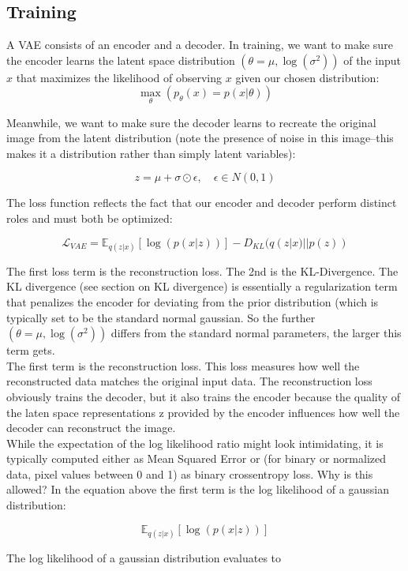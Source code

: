 \documentclass[12pt]{article}
\begin{document}
\subsection{Training}
A VAE consists of an encoder and a decoder. In training, we want to make sure the encoder learns the latent space distribution \((\theta = \mu, \log(\sigma^2))\) of the input \(x\) that maximizes the likelihood of observing \(x\) given our chosen distribution:
\[\max_\theta(p_\theta(x) = p(x | \theta))\]

Meanwhile, we want to make sure the decoder learns to recreate the original image from the latent distribution (note the presence of noise in this image--this makes it a distribution rather than simply latent variables):

\[z = \mu + \sigma \odot \epsilon, \quad \epsilon \in N(0,1)\]

The loss function reflects the fact that our encoder and decoder perform distinct roles and must both be optimized:

\[\mathcal{L}_{VAE}= \mathbb{E}_{q(z|x)}[\log(p(x|z))] - D_{KL}(q(z|x)||p(z))\]

The first loss term is the reconstruction loss. The 2nd is the KL-Divergence. The KL divergence (see section on KL divergence) is essentially a regularization term that penalizes the encoder for deviating from the prior distribution (which is typically set to be the standard normal gaussian. So the further \((\theta = \mu, \log(\sigma^2))\) differs from the standard normal parameters, the larger this term gets.\\

The first term is the reconstruction loss. This loss measures how well the reconstructed data matches the original input data. The reconstruction loss obviously trains the decoder, but it also trains the encoder because the quality of the laten space representations z provided by the encoder influences how well the decoder can reconstruct the image. \\

While the expectation of the log likelihood ratio might look intimidating, it is typically computed either as Mean Squared Error or (for binary or normalized data, pixel values between 0 and 1) as binary crossentropy loss. Why is this allowed? In the equation above the first term is the log likelihood of a gaussian distribution:

\[ \mathbb{E}_{q(z|x)}[\log(p(x|z))] \]

The log likelihood of a gaussian distribution evaluates to 
\end{document}
